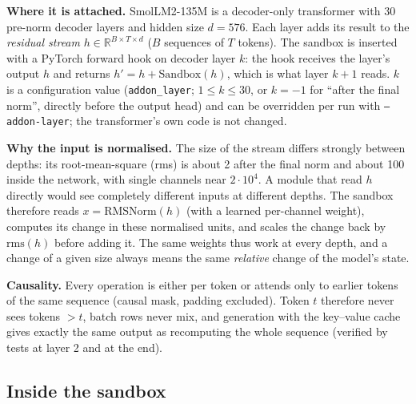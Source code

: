 \documentclass[a4paper,12pt,parskip=half,headsepline]{scrartcl}
\newcommand{\code}[1]{\texttt{\small #1}}
\begin{document}
\begin{tech}
\textbf{Where it is attached.} SmolLM2-135M is a decoder-only transformer with 30
pre-norm decoder layers and hidden size $d = 576$. Each layer adds its result to the
\emph{residual stream} $h \in \mathbb{R}^{B \times T \times d}$ ($B$ sequences of $T$
tokens). The sandbox is inserted with a PyTorch forward hook on decoder layer $k$: the
hook receives the layer's output $h$ and returns $h' = h + \text{Sandbox}(h)$, which is
what layer $k+1$ reads. $k$ is a configuration value (\code{addon\_layer}; $1 \le k \le 30$,
or $k = -1$ for ``after the final norm'', directly before the output head) and can be
overridden per run with \code{--addon-layer}; the transformer's own code is not changed.

\textbf{Why the input is normalised.} The size of the stream differs strongly between
depths: its root-mean-square (rms) is about 2 after the final norm and about 100 inside
the network, with single channels near $2\cdot10^4$. A module that read $h$ directly would
see completely different inputs at different depths. The sandbox therefore reads
$x = \text{RMSNorm}(h)$ (with a learned per-channel weight), computes its change in these
normalised units, and scales the change back by $\text{rms}(h)$ before adding it. The same
weights thus work at every depth, and a change of a given size always means the same
\emph{relative} change of the model's state.

\textbf{Causality.} Every operation is either per token or attends only to earlier tokens
of the same sequence (causal mask, padding excluded). Token $t$ therefore never sees
tokens $> t$, batch rows never mix, and generation with the key--value cache gives
exactly the same output as recomputing the whole sequence (verified by tests at layer 2
and at the end).
\end{tech}

\subsection{Inside the sandbox}
\end{document}
